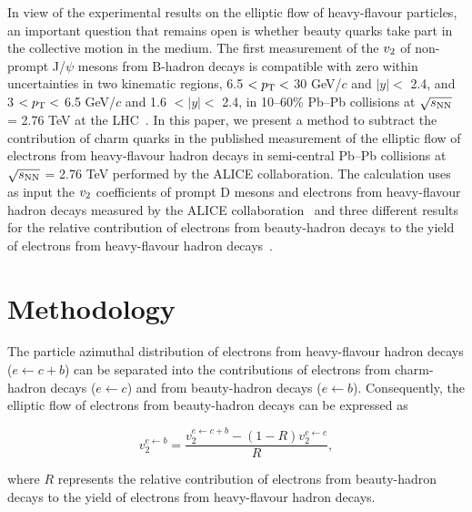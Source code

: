 \documentclass[11pt,a4paper]{article}
\providecommand{\vtwo}{$v_{\rm 2}$ }
\providecommand{\snn}{$\sqrt{s_{\rm NN}}$ }
\begin{document}
In view of the experimental results on the elliptic flow of heavy-flavour particles, an important  question that remains open is whether beauty quarks take part in the collective motion in the medium. 
The first measurement of the \vtwo of non-prompt J/$\psi$ mesons from $\mathrm{B}$-hadron decays is compatible with zero within uncertainties in two kinematic regions, 
6.5 $< p_{\rm T} <$ 30 GeV/$c$ and $|y| <$ 2.4, and   3 $< p_{\rm T} <$ 6.5 GeV/$c$ and 1.6 $< |y| <$ 2.4, in 10--60\% Pb--Pb collisions at \snn = 2.76 TeV at the LHC~\cite{Khachatryan:2016ypw}.
In this paper, we present a method to subtract the contribution of  charm quarks in the published measurement of the elliptic flow of electrons from heavy-flavour hadron decays in semi-central Pb--Pb collisions at \snn = 2.76 TeV performed by the ALICE collaboration. The calculation uses  as input the \vtwo coefficients of prompt D mesons and electrons from heavy-flavour hadron decays measured by the ALICE collaboration~\cite{Abelev:2014ipa,Adam:2016ssk} and three different results for the relative contribution of electrons from beauty-hadron decays to the yield of electrons from heavy-flavour hadron decays~\cite{Abelev:2014hla,2016507,Uphoff:2014hza,Uphoff:2012gb}.


\section{Methodology}
\label{Sec:Methodology}

The particle azimuthal distribution of electrons from heavy-flavour hadron decays ($e \leftarrow c+b$)   can be separated into the contributions of electrons from charm-hadron decays ($e \leftarrow c$) and from beauty-hadron decays ($e \leftarrow b$). Consequently, the elliptic flow of electrons from beauty-hadron decays can be expressed as

\begin{equation}
v_{2}^{e \leftarrow b} = \frac{v_{2}^{e \leftarrow c+b} - (1- R)v_{2}^{e \leftarrow c}}{R},
\label{eq:ElecFrombeautyV2}
\end{equation}   

\noindent where $R$ represents the relative contribution of electrons from beauty-hadron decays to the yield of electrons from heavy-flavour hadron decays.
\end{document}
